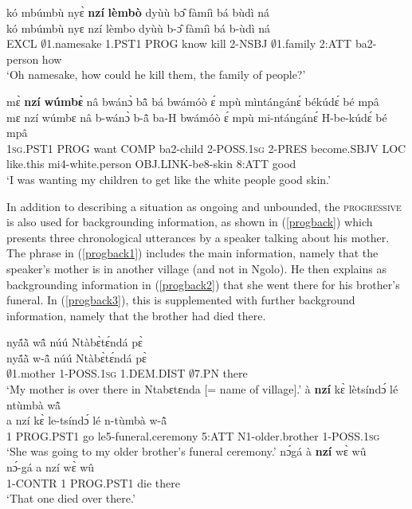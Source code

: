 \begin{exe} 
\ex\label{Progstative}
  \glll kó mbúmbù nyɛ̀ {\bfseries nzí} {\bfseries lèmbò} dyùù bɔ̂ fàmíì bá bùdì ná \\
       kó mbúmbù nyɛ nzí lèmbo dyùù b-ɔ̂ fàmíì bá b-ùdì ná \\
       EXCL $\emptyset$1.namesake 1.PST1 PROG know kill 2-NSBJ $\emptyset$1.family 2:ATT ba2-person how \\
    \trans `Oh namesake, how could he kill them, the family of people?'
\end{exe}

\begin{exe}
\ex\label{Progmodal}
  \glll mɛ̀ {\bfseries nzí} {\bfseries wúmbɛ̀} nâ bwánɔ̀ bã̂ bá bwámóò ɛ́ mpù mìntángánɛ́ békúdɛ́ bé mpâ\\
        mɛ nzí wúmbɛ nâ b-wánɔ̀ b-ã̂ ba-H bwámóò ɛ́ mpù mi-ntángánɛ́ H-be-kúdɛ́ bé mpâ \\
        1\textsc{sg}.PST1 PROG want COMP ba2-child 2-POSS.1\textsc{sg} 2-PRES become.SBJV LOC like.this mi4-white.person OBJ.LINK-be8-skin 8:ATT good \\
    \trans `I was wanting my children to get like the white people good skin.'
\end{exe}

In addition to describing a situation as ongoing and unbounded, the \textsc{progressive} is also used for backgrounding information, as shown in (\ref{progback}) which presents three chronological utterances by a speaker talking about his mother. The phrase in (\ref{progback1}) includes the main information, namely that the speaker's mother is in another village (and not in Ngolo). He then explains as backgrounding information in (\ref{progback2}) that she went there for his brother's funeral. In (\ref{progback3}), this is supplemented with further background information, namely that the brother had died there. 

\begin{exe} 
\ex\label{progback} 
\begin{xlist}
\ex\label{progback1} 
  \glll  nyã́ã̀ wã̂ núú Ntàbɛ̀tɛ́ndá pɛ̀\\
         nyã́ã̀ w-ã̂ núú Ntàbɛ̀tɛ́ndá pɛ̀ \\
          $\emptyset$1.mother 1-POSS.1\textsc{sg} 1.DEM.DIST $\emptyset$7.PN there  \\
    \trans `My mother is over there in Ntabɛtɛnda [= name of village].'
\ex\label{progback2} 
  \glll à {\bfseries nzí} kɛ̀ lètsíndɔ́ lé ntùmbà wã̂\\
        a nzí kɛ̀ le-tsíndɔ́ lé n-tùmbà w-ã̂ \\
         1 PROG.PST1 go le5-funeral.ceremony 5:ATT N1-older.brother 1-POSS.1\textsc{sg}   \\
    \trans `She was going to my older brother's funeral ceremony.'
\ex\label{progback3} 
  \glll nɔ́gá à {\bfseries nzí} wɛ̀ wû \\
        nɔ́-gá a nzí wɛ̀ wû \\
         1-CONTR 1 PROG.PST1 die there   \\
    \trans `That one died over there.'
\end{xlist}
\end{exe}

